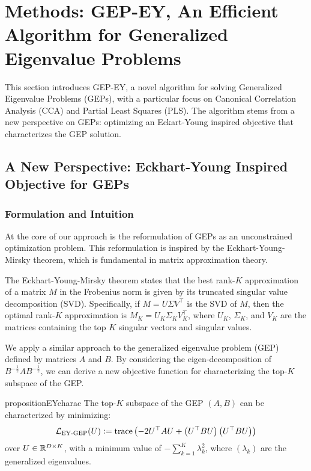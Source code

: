 \section{Methods: GEP-EY, An Efficient Algorithm for Generalized Eigenvalue Problems}\label{sec:contributions}
This section introduces GEP-EY, a novel algorithm for solving Generalized Eigenvalue Problems (GEPs), with a particular focus on Canonical Correlation Analysis (CCA) and Partial Least Squares (PLS). The algorithm stems from a new perspective on GEPs: optimizing an Eckart-Young inspired objective that characterizes the GEP solution.

\subsection{A New Perspective: Eckhart-Young Inspired Objective for GEPs}

\subsubsection{Formulation and Intuition}
At the core of our approach is the reformulation of GEPs as an unconstrained optimization problem. This reformulation is inspired by the Eckhart-Young-Mirsky theorem, which is fundamental in matrix approximation theory.

The Eckhart-Young-Mirsky theorem states that the best rank-$K$ approximation of a matrix \(M\) in the Frobenius norm is given by its truncated singular value decomposition (SVD). Specifically, if \(M = U \Sigma V^\top\) is the SVD of \(M\), then the optimal rank-$K$ approximation is \(M_K = U_K \Sigma_K V_K^\top\), where \(U_K\), \(\Sigma_K\), and \(V_K\) are the matrices containing the top $K$ singular vectors and singular values.

We apply a similar approach to the generalized eigenvalue problem (GEP) defined by matrices \(A\) and \(B\). By considering the eigen-decomposition of \(B^{-\frac{1}{2}} A B^{-\frac{1}{2}}\), we can derive a new objective function for characterizing the top-$K$ subspace of the GEP.

\begin{restatable}{proposition}{EYcharac}
    \label{prop:EY-charac}
    The top-$K$ subspace of the GEP $(A,B)$ can be characterized by minimizing:
    \begin{align}\label{eq:EY-charac}
    \mathcal{L}_\text{EY-GEP}(U) \vcentcolon= \operatorname{trace} \left( - 2U^\top A U + \left(U^\top B U\right) \left(U^\top B U\right) \right)
    \end{align}
    over $U \in \mathbb{R}^{D \times K}$, with a minimum value of $- \sum_{k=1}^K \lambda_k^2$, where $(\lambda_k)$ are the generalized eigenvalues.
\end{restatable}
    
